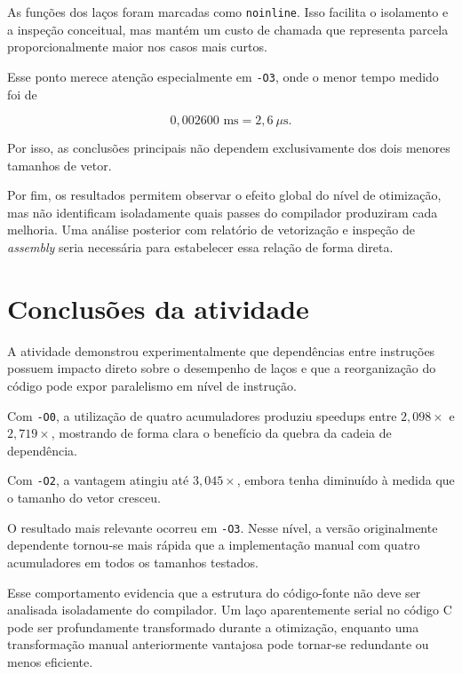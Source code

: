 As funções dos laços foram marcadas como \texttt{noinline}. Isso facilita o isolamento e a
inspeção conceitual, mas mantém um custo de chamada que representa parcela proporcionalmente
maior nos casos mais curtos.

Esse ponto merece atenção especialmente em \texttt{-O3}, onde o menor tempo medido foi de

\begin{equation}
0{,}002600\text{ ms}=2{,}6\ \mu\text{s}.
\end{equation}

Por isso, as conclusões principais não dependem exclusivamente dos dois menores tamanhos de
vetor.

Por fim, os resultados permitem observar o efeito global do nível de otimização, mas não
identificam isoladamente quais passes do compilador produziram cada melhoria. Uma análise
posterior com relatório de vetorização e inspeção de \textit{assembly} seria necessária para
estabelecer essa relação de forma direta.


\section{Conclusões da atividade}

\label{sec:atvd02-conclusao}

A atividade demonstrou experimentalmente que dependências entre instruções possuem impacto
direto sobre o desempenho de laços e que a reorganização do código pode expor paralelismo em
nível de instrução.

Com \texttt{-O0}, a utilização de quatro acumuladores produziu speedups entre
\(2{,}098\times\) e \(2{,}719\times\), mostrando de forma clara o benefício da quebra da
cadeia de dependência.

Com \texttt{-O2}, a vantagem atingiu até \(3{,}045\times\), embora tenha diminuído à medida
que o tamanho do vetor cresceu.

O resultado mais relevante ocorreu em \texttt{-O3}. Nesse nível, a versão originalmente
dependente tornou-se mais rápida que a implementação manual com quatro acumuladores em todos
os tamanhos testados.

Esse comportamento evidencia que a estrutura do código-fonte não deve ser analisada
isoladamente do compilador. Um laço aparentemente serial no código C pode ser profundamente
transformado durante a otimização, enquanto uma transformação manual anteriormente vantajosa
pode tornar-se redundante ou menos eficiente.

